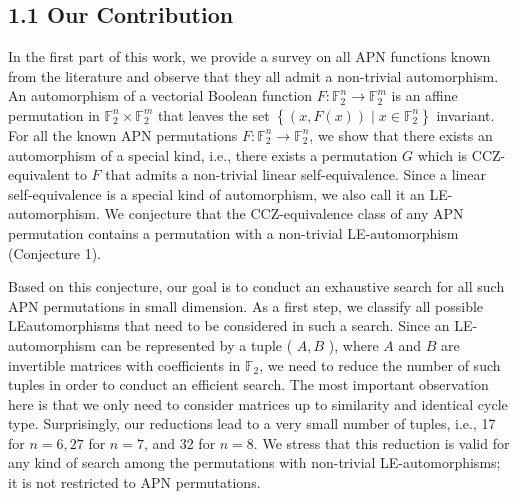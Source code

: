 \documentclass[10pt]{article}
\begin{document}
\subsection*{1.1 Our Contribution}
In the first part of this work, we provide a survey on all APN functions known from the literature and observe that they all admit a non-trivial automorphism. An automorphism of a vectorial Boolean function $F: \mathbb{F}_{2}^{n} \rightarrow \mathbb{F}_{2}^{m}$ is an affine permutation in $\mathbb{F}_{2}^{n} \times \mathbb{F}_{2}^{m}$ that leaves the set $\left\{(x, F(x)) \mid x \in \mathbb{F}_{2}^{n}\right\}$ invariant. For all the known APN permutations $F: \mathbb{F}_{2}^{n} \rightarrow \mathbb{F}_{2}^{n}$, we show that there exists an automorphism of a special kind, i.e., there exists a permutation $G$ which is CCZ-equivalent to $F$ that admits a non-trivial linear self-equivalence. Since a linear self-equivalence is a special kind of automorphism, we also call it an LE-automorphism. We conjecture that the CCZ-equivalence class of any APN permutation contains a permutation with a non-trivial LE-automorphism (Conjecture 1).

Based on this conjecture, our goal is to conduct an exhaustive search for all such APN permutations in small dimension. As a first step, we classify all possible LEautomorphisms that need to be considered in such a search. Since an LE-automorphism can be represented by a tuple ( $A, B$ ), where $A$ and $B$ are invertible matrices with coefficients in $\mathbb{F}_{2}$, we need to reduce the number of such tuples in order to conduct an efficient search. The most important observation here is that we only need to consider matrices up to similarity and identical cycle type. Surprisingly, our reductions lead to a very small number of tuples, i.e., 17 for $n=6,27$ for $n=7$, and 32 for $n=8$. We stress that this reduction is valid for any kind of search among the permutations with non-trivial LE-automorphisms; it is not restricted to APN permutations.
\end{document}
